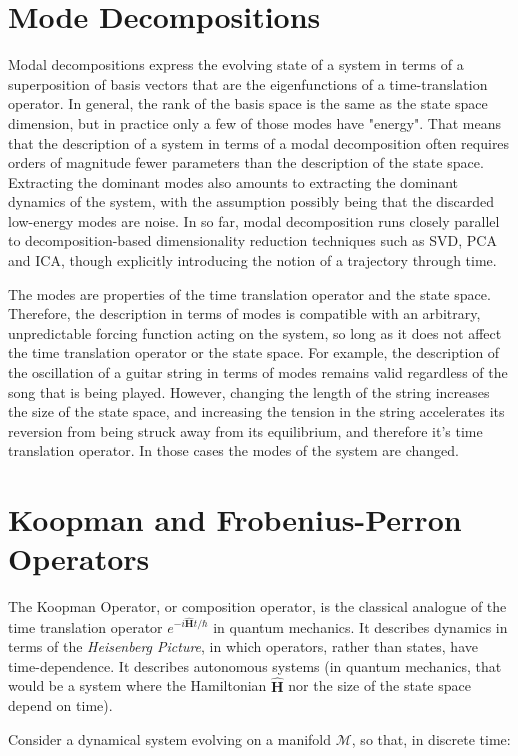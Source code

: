 \section{Mode Decompositions}
Modal decompositions express the evolving state of a system in terms of a superposition of basis vectors that are the eigenfunctions of a time-translation operator. In general, the rank of the basis space is the same as the state space dimension, but in practice only a few of those modes have "energy". That means that the description of a system in terms of a modal decomposition often requires orders of magnitude fewer parameters than the description of the state space. Extracting the dominant modes also amounts to extracting the dominant dynamics of the system, with the assumption possibly being that the discarded low-energy modes are noise. In so far, modal decomposition runs closely parallel to decomposition-based dimensionality reduction techniques such as SVD, PCA and ICA, though explicitly introducing the notion of a trajectory through time.

The modes are properties of the time translation operator and the state space. Therefore, the description in terms of modes is compatible with an arbitrary, unpredictable forcing function acting on the system, so long as it does not affect the time translation operator or the state space. For example, the description of the oscillation of a guitar string in terms of modes remains valid regardless of the song that is being played. However, changing the length of the string increases the size of the state space, and increasing the tension in the string accelerates its reversion from being struck away from its equilibrium, and therefore it's time translation operator. In those cases the modes of the system are changed.   


\section{Koopman and Frobenius-Perron Operators}
The Koopman Operator, or composition operator, is the classical analogue of the time translation operator $e^{-i\mathbf{\hat{H}}t/\hbar}$ in quantum mechanics. It describes dynamics in terms of the \textit{Heisenberg Picture}, in which operators, rather than states, have time-dependence. It describes autonomous systems (in quantum mechanics, that would be a system where the Hamiltonian $\mathbf{\hat{H}}$ nor the size of the state space depend on time).

Consider a dynamical system evolving on a manifold $\mathscr{M}$, so that, in discrete time:

